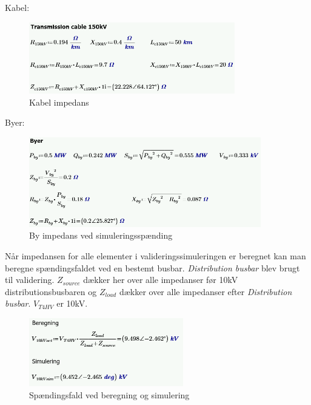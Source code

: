 Kabel:
\begin{figure}[H] %
	\centering
	\includegraphics[width=0.8\textwidth]{figurer/Kabel_validering}
	\caption{Kabel impedans}
	\label{fig:Kabelimpedans}
\end{figure}
\newpage
Byer:
\begin{figure}[H] %
	\centering
	\includegraphics[width=0.9\textwidth]{figurer/By_validering}
	\caption{By impedans ved simuleringsspænding}
	\label{fig:Byimpedans}
\end{figure}

 Når impedansen for alle elementer i valideringssimuleringen er beregnet kan man beregne spændingsfaldet ved en bestemt busbar. \textit{Distribution busbar} blev brugt til validering. $Z_{source}$ dækker her over alle impedanser før 10kV distributionsbusbaren og $Z_{load}$ dækker over alle impedanser efter \textit{Distribution busbar}. $V_{T4HV}$ er 10kV.
 
 \begin{figure}[H] %
 	\centering
 	\includegraphics[width=0.6\textwidth]{figurer/Spaendingsfald_validering}
 	\caption{Spændingsfald ved beregning og simulering}
 	\label{fig:Spaendingsfald_validering}
 \end{figure}
 
